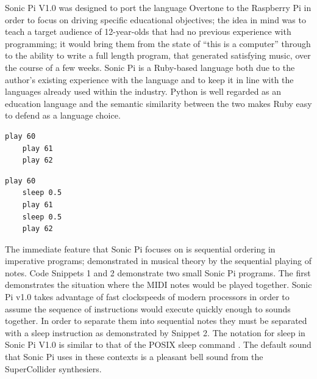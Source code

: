\documentclass[11pt, abstracton, twoside, titlepage=true]{scrartcl}
\begin{document}
\begin{multicols}{2}
Sonic Pi V1.0 was designed to port the language Overtone to the Raspberry Pi in 
order to focus on driving specific educational objectives; the idea in mind was 
to teach a target audience of 12-year-olds that had no previous experience with 
programming; it would bring them from the state of ``this is a computer'' through 
to the ability to write a full length program, that generated satisfying music, 
over the course of a few weeks. Sonic Pi is a Ruby-based language both due to 
the author's existing experience with the language and to keep it in line with 
the languages already used within the industry. Python is well regarded as an 
education language and the semantic similarity between the two makes Ruby easy 
to defend as a language choice.
\\

\begin{minipage}{0.5\textwidth}
	\begin{minipage}[t]{\textwidth}
		\begin{lstlisting}[style = sonicpi]
	play 60
	play 61
	play 62
		\end{lstlisting}
	\end{minipage}

	\begin{minipage}[t]{\textwidth}
		\begin{lstlisting}[style = sonicpi]
	play 60
	sleep 0.5
	play 61
	sleep 0.5
	play 62
		\end{lstlisting}
	\end{minipage}
\end{minipage}

\end{multicols}

The immediate feature that Sonic Pi focuses on is sequential ordering in 
imperative programs; demonstrated in musical theory by the sequential playing 
of notes. Code Snippets 1 and 2 demonstrate two small Sonic Pi programs. The 
first demonstrates the situation where the MIDI notes would be played together. 
Sonic Pi v1.0 takes advantage of fast clockspeeds of modern processors in order 
to assume the sequence of instructions would execute quickly enough 
to sounds together. In order to separate them into sequential notes they must 
be separated with a sleep instruction as demonstrated by Snippet 2. The notation 
for sleep in Sonic Pi V1.0 is similar to that of the POSIX sleep command 
\cite{IG13}. The default sound that Sonic Pi uses in these contexts is a 
pleasant bell sound from the SuperCollider synthesiers.
\end{document}
